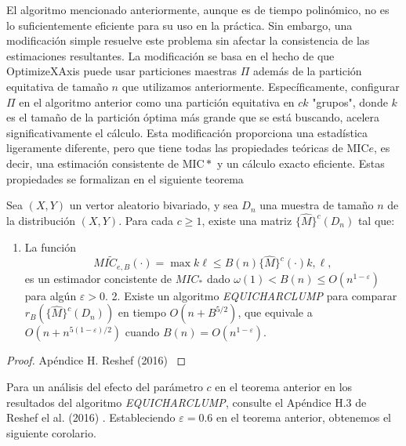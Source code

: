         El algoritmo mencionado anteriormente, aunque es de tiempo polin\'omico, no es lo suficientemente eficiente para su uso en la pr\'actica. Sin embargo, una modificaci\'on simple resuelve este problema sin afectar la consistencia de las estimaciones resultantes. La modificaci\'on se basa en el hecho de que OptimizeXAxis puede usar particiones maestras $\Pi$ adem\'as de la partici\'on equitativa de tama\~no $n$ que utilizamos anteriormente. Espec\'ificamente, configurar $\Pi$ en el algoritmo anterior como una partici\'on equitativa en $c k$ "grupos", donde $k$ es el tama\~no de la partici\'on \'optima m\'as grande que se est\'a buscando, acelera significativamente el c\'alculo. Esta modificaci\'on proporciona una estad\'istica ligeramente diferente, pero que tiene todas las propiedades te\'oricas de $\mathrm{MIC}e$, es decir, una estimaci\'on consistente de $\mathrm{MIC}*$ y un c\'alculo exacto eficiente. Estas propiedades se formalizan en el siguiente teorema
    
        \begin{thm}
            Sea $(X, Y)$  un vertor aleatorio bivariado, y sea $D_n$ una muestra de tama\~no $n$ de la distribuci\'on $(X, Y)$. Para cada $c \geq 1$, existe una matriz $\{\widehat{M}\}^c\left(D_n\right)$ tal que:
            \begin{enumerate}
                \item La funci\'on
                $$
                \widetilde{M I C_{e, B}}(\cdot)=\max {k \ell \leq B(n)}\{\widehat{M}\}^c(\cdot){k, \ell},
                $$
                es un estimador concistente de $M I C_*$ dado $\omega(1)<B(n) \leq O\left(n^{1-\varepsilon}\right)$ para alg\'un $\varepsilon>0$.
                2. Existe un algoritmo \textit{EQUICHARCLUMP} para comparar $r_B\left(\{\widehat{M}\}^c\left(D_n\right)\right)$ en tiempo $O\left(n+B^{5 / 2}\right)$, que equivale a $O\left(n+n^{5(1-\varepsilon) / 2}\right)$ cuando $B(n)=O\left(n^{1-\varepsilon}\right)$.
            \end{enumerate}
        \end{thm}
        \begin{proof}
            Ap\'endice H. Reshef (2016) \cite{Reshef2016}
        \end{proof}

        Para un an\'alisis del efecto del par\'ametro $c$ en el teorema anterior en los resultados del algoritmo \textit{EQUICHARCLUMP}, consulte el Ap\'endice H.3 de Reshef el al. (2016) \cite{Reshef2016}. Estableciendo $\varepsilon=0.6$ en el teorema anterior, obtenemos el siguiente corolario.

